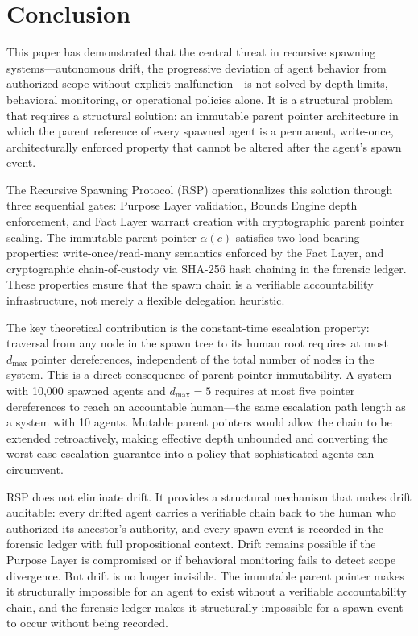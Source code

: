 
\section{Conclusion}
\label{sec:conclusion}

This paper has demonstrated that the central threat in recursive spawning systems---autonomous drift, the progressive deviation of agent behavior from authorized scope without explicit malfunction---is not solved by depth limits, behavioral monitoring, or operational policies alone. It is a structural problem that requires a structural solution: an immutable parent pointer architecture in which the parent reference of every spawned agent is a permanent, write-once, architecturally enforced property that cannot be altered after the agent's spawn event.

The Recursive Spawning Protocol (RSP) operationalizes this solution through three sequential gates: Purpose Layer validation, Bounds Engine depth enforcement, and Fact Layer warrant creation with cryptographic parent pointer sealing. The immutable parent pointer $\alpha(c)$ satisfies two load-bearing properties: write-once/read-many semantics enforced by the Fact Layer, and cryptographic chain-of-custody via SHA-256 hash chaining in the forensic ledger. These properties ensure that the spawn chain is a verifiable accountability infrastructure, not merely a flexible delegation heuristic.

The key theoretical contribution is the constant-time escalation property: traversal from any node in the spawn tree to its human root requires at most $d_{\max}$ pointer dereferences, independent of the total number of nodes in the system. This is a direct consequence of parent pointer immutability. A system with 10,000 spawned agents and $d_{\max} = 5$ requires at most five pointer dereferences to reach an accountable human---the same escalation path length as a system with 10 agents. Mutable parent pointers would allow the chain to be extended retroactively, making effective depth unbounded and converting the worst-case escalation guarantee into a policy that sophisticated agents can circumvent.

RSP does not eliminate drift. It provides a structural mechanism that makes drift auditable: every drifted agent carries a verifiable chain back to the human who authorized its ancestor's authority, and every spawn event is recorded in the forensic ledger with full propositional context. Drift remains possible if the Purpose Layer is compromised or if behavioral monitoring fails to detect scope divergence. But drift is no longer invisible. The immutable parent pointer makes it structurally impossible for an agent to exist without a verifiable accountability chain, and the forensic ledger makes it structurally impossible for a spawn event to occur without being recorded.

